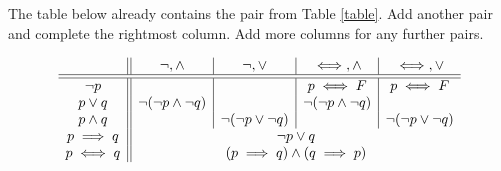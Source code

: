 \documentclass[a4paper]{exam}
\begin{document}
\begin{questions}
\begin{parts}
  The table below already contains the pair from Table \ref{table}. Add another pair and complete the rightmost column. Add more columns for any further pairs.
  \begin{solution} \null\newline
    \[
      \begin{array}{c||c|c|c|c}
  & \neg, \land & \neg, \lor & \iff, \land  & \iff, \lor\\
  \hline\hline
  \neg p  & & & p \iff F & p \iff F \\
  p \lor q  & \neg(\neg p \land \neg q) & & \neg(\neg p \land \neg q) & \\
  p \land q  & & \neg(\neg p \lor \neg q) & & \neg(\neg p \lor \neg q) \\
  p \implies q & \multicolumn{4}{c}{\neg p \lor q} \\
  p \iff q & \multicolumn{4}{c}{(p \implies q) \land (q \implies p)} \\
      \end{array}
      \]
  \end{solution}
\end{parts}
\end{questions}
\end{document}
